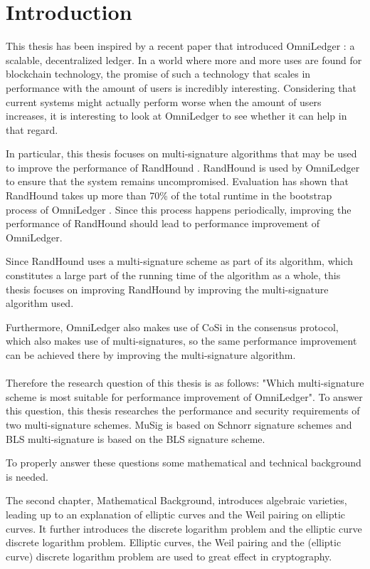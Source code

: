 \chapter{Introduction}
This thesis has been inspired by a recent paper that introduced OmniLedger \cite{OmniLedger}: a scalable, decentralized ledger. In a world where more and more uses are found for blockchain technology, the promise of such a technology that scales in performance with the amount of users is incredibly interesting. Considering that current systems might actually perform worse when the amount of users increases, it is interesting to look at OmniLedger to see whether it can help in that regard.

In particular, this thesis focuses on multi-signature algorithms that may be used to improve the performance of RandHound \cite{RandHound}. RandHound is used by OmniLedger to ensure that the system remains uncompromised. Evaluation has shown that RandHound takes up more than 70\% of the total runtime in the bootstrap process of OmniLedger \cite{OmniLedger}. Since this process happens periodically, improving the performance of RandHound should lead to performance improvement of OmniLedger. 

Since RandHound uses a multi-signature scheme as part of its algorithm, which constitutes a large part of the running time of the algorithm as a whole, this thesis focuses on improving RandHound by improving the multi-signature algorithm used.

Furthermore, OmniLedger also makes use of CoSi \cite{CoSi} in the consensus protocol, which also makes use of multi-signatures, so the same performance improvement can be achieved there by improving the multi-signature algorithm.
\\
\\
Therefore the research question of this thesis is as follows: "Which multi-signature scheme is most suitable for performance improvement of OmniLedger". To answer this question, this thesis researches the performance and security requirements of two multi-signature schemes. MuSig \cite{SchnorrMulti} is based on Schnorr signature schemes and BLS multi-signature \cite{BLSMulti} is based on the BLS \cite{BLS} signature scheme.

To properly answer these questions some mathematical and technical background is needed.

The second chapter, Mathematical Background, introduces algebraic varieties, leading up to an explanation of elliptic curves and the Weil pairing on elliptic curves. It further introduces the discrete logarithm problem and the elliptic curve discrete logarithm problem. Elliptic curves, the Weil pairing and the (elliptic curve) discrete logarithm problem are used to great effect in cryptography.

